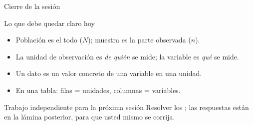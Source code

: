 \documentclass[aspectratio=169,10pt]{beamer}
\begin{document}
\begin{frame}{Cierre de la sesión}
  \begin{block}{Lo que debe quedar claro hoy}
    \begin{itemize}
      \item Población es el todo ($N$); muestra es la parte observada ($n$).
      \item La unidad de observación es \emph{de quién} se mide; la variable es
            \emph{qué} se mide.
      \item Un dato es un valor concreto de una variable en una unidad.
      \item En una tabla: filas = unidades, columnas = variables.
    \end{itemize}
  \end{block}

  \vspace{0.25cm}
  \begin{alertblock}{Trabajo independiente para la próxima sesión}
    \footnotesize
    Resolver los ; las
    respuestas están en la lámina posterior, para que usted mismo se corrija.
  \end{alertblock}
\end{frame}
\end{document}
